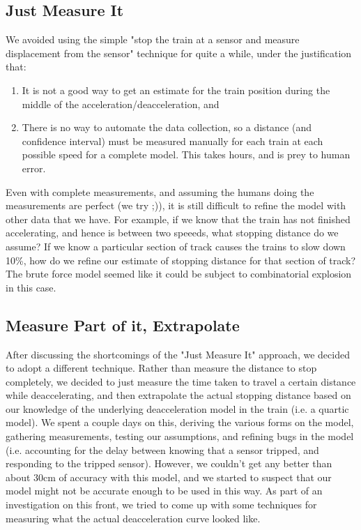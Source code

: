 \documentclass[titlepage]{article}
\begin{document}
\subsection{Just Measure It}
We avoided using the simple "stop the train
at a sensor and measure displacement from the sensor" technique for quite a
while, under the justification that:
\begin{enumerate}
\item It is not a good way to get an estimate for the train position during
	the middle of the acceleration/deacceleration, and
\item There is no way to automate the data collection, so a distance (and
confidence interval) must be measured manually for each train at each possible
speed for a complete model. This takes hours, and is prey to human error.
\end{enumerate}
Even with complete measurements, and assuming the humans doing the measurements
are perfect (we try ;)), it is still difficult to refine the model with other
data that we have. For example, if we know that the train has not finished
accelerating, and hence is between two speeeds, what stopping distance do we
assume? If we know a particular section of track causes the trains to slow
down 10\%, how do we refine our estimate of stopping distance for that section
of track? The brute force model seemed like it could be subject to
combinatorial explosion in this case.

\subsection{Measure Part of it, Extrapolate}
After discussing the shortcomings of the "Just Measure It" approach, we decided
to adopt a different technique. Rather than measure the distance to stop
completely, we decided to just measure the time taken to travel a certain
distance while deaccelerating, and then extrapolate the actual stopping distance
based on our knowledge of the underlying deacceleration model in the train
(i.e. a quartic model). We spent a couple days on this, deriving the various
forms on the model, gathering measurements, testing our assumptions, and
refining bugs in the model (i.e. accounting for the delay between knowing that
a sensor tripped, and responding to the tripped sensor). However, we couldn't
get any better than about 30cm of accuracy with this model, and we started to
suspect that our model might not be accurate enough to be used in this way. As
part of an investigation on this front, we tried to come up with some techniques
for measuring what the actual deacceleration curve looked like.
\end{document}

